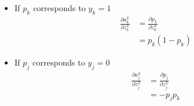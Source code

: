 \begin{itemize}
				\begin{itemize}
					\item If $p_k$ corresponds to $y_k=1$
						\begin{equation}
						\label{eq:softmax_deriv_1}
							\begin{split}
								\frac{\partial a^L_k}{\partial z^L_k}
								&= \frac{\partial p_k}{\partial z^L_k} \\
								&= p_k (1-p_k)
							\end{split}
						\end{equation}
					\item If $p_j$ corresponds to $y_j=0$
						\begin{equation}
						\label{eq:softmax_deriv_2}
							\begin{split}
								\frac{\partial a^L_j}{\partial z^L_j}
								&= \frac{\partial p_j}{\partial z^L_j}\\
								&= -p_j p_k
							\end{split}
						\end{equation}
				\end{itemize}
			\end{itemize}

